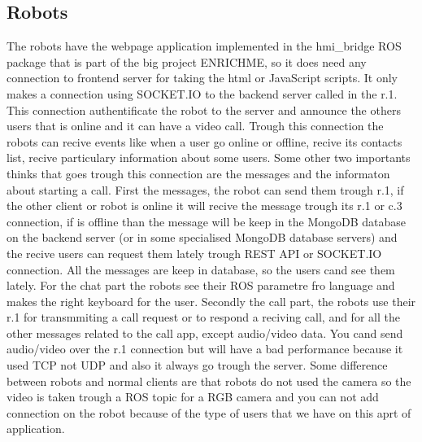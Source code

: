 \subsection{Robots}
\label{sub-sec:callApp-robots}

The robots have the webpage application implemented in the hmi_bridge ROS package that is part of
the big project ENRICHME, so it does need any connection to frontend server for taking the html or
JavaScript scripts. It only makes a connection using SOCKET.IO to the backend server called in the 
 r.1. This connection authentificate the robot to the
server and announce the others users that is online and it can have a video call. Trough this connection
the robots can recive events like when a user go online or offline, recive its contacts list, recive
particulary information about some users. Some other two importants thinks that goes trough this connection
are the messages and the informaton about starting a call. First the messages, the robot can send them trough
r.1, if the other client or robot is online it will recive the message trough its r.1 or c.3 connection, if is
offline than the message will be keep in the MongoDB database on the backend server (or in some specialised MongoDB
database servers) and the recive users can request them lately trough REST API or SOCKET.IO connection. All the messages
are keep in database, so the users cand see them lately. For the chat part the robots see their ROS parametre fro language
and makes the right keyboard for the user. Secondly the call part, the robots use their r.1 for transmmiting 
a call request or to respond a reciving call, and for all the other messages related to the call app, except
audio/video data. You cand send audio/video over the r.1 connection but will have a bad performance because it
used TCP not UDP and also it always go trough the server. Some difference between robots and normal clients are
that robots do not used the camera so the video is taken trough a ROS topic for a RGB camera and you can not add
connection on the robot because of the type of users that we have on this aprt of application.

